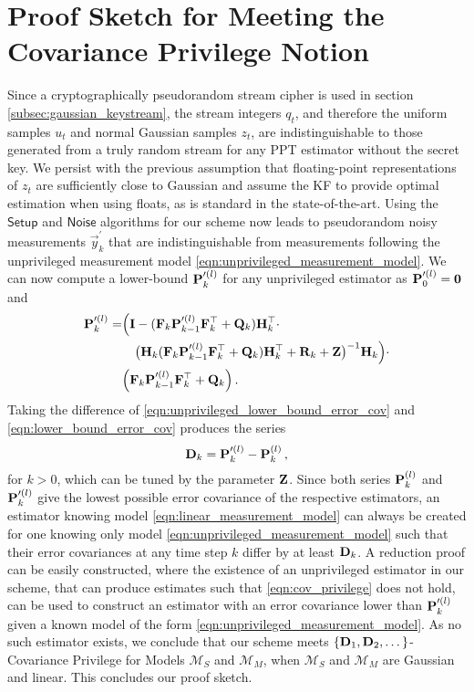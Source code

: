 \chapter{Proof Sketch for Meeting the Covariance Privilege Notion}\label{app:priv_est_proof_sketch}
Since a cryptographically pseudorandom stream cipher is used in section \ref{subsec:gaussian_keystream}, the stream integers $q_t$, and therefore the uniform samples $u_t$ and normal Gaussian samples $z_t$, are indistinguishable to those generated from a truly random stream for any PPT estimator without the secret key. We persist with the previous assumption that floating-point representations of $z_t$ are sufficiently close to Gaussian and assume the KF to provide optimal estimation when using floats, as is standard in the state-of-the-art. Using the $\mathsf{Setup}$ and $\mathsf{Noise}$ algorithms for our scheme now leads to pseudorandom noisy measurements $\vec{y}^\prime_k$ that are indistinguishable from measurements following the unprivileged measurement model \eqref{eqn:unprivileged_measurement_model}. We can now compute a lower-bound ${{\mathbf{P}}}_k^{\prime(l)}$ for any unprivileged estimator as ${{\mathbf{P}}}_0^{\prime(l)}={{\mathbf{0}}}$ and
\begin{equation}\label{eqn:unprivileged_lower_bound_error_cov}
   \begin{split}
      {\ensuremath{{\mathbf{P}}}}_k^{\prime(l)} =& \Bigl( {{\mathbf{I}}} - ({{\mathbf{F}}}_k{{\mathbf{P}}}_{k-1}^{\prime(l)}{{\mathbf{F}}}_k^\top + {{\mathbf{Q}}}_k){{\mathbf{H}}}_k^\top \cdot \\
      &\quad\bigl({{\mathbf{H}}}_k({{\mathbf{F}}}_k{{\mathbf{P}}}_{k-1}^{\prime(l)}{{\mathbf{F}}}_k^\top + {{\mathbf{Q}}}_k){{\mathbf{H}}}_k^\top + {{\mathbf{R}}}_k+{{\mathbf{Z}}}\bigr)^{-1}{{\mathbf{H}}}_k\Bigr)\cdot\\
      &\Bigl({{\mathbf{F}}}_k{{\mathbf{P}}}_{k-1}^{\prime(l)}{{\mathbf{F}}}_k^\top + {{\mathbf{Q}}}_k\Bigr)\,.
   \end{split}
\end{equation}
Taking the difference of \eqref{eqn:unprivileged_lower_bound_error_cov} and \eqref{eqn:lower_bound_error_cov} produces the series
\begin{equation}\label{eqn:covariance_difference_series}
   {\ensuremath{{\mathbf{D}}}}_k = {{\mathbf{P}}}_k^{\prime(l)} - {{\mathbf{P}}}_k^{(l)}\,,
\end{equation}
for $k>0$, which can be tuned by the parameter ${{\mathbf{Z}}}$. Since both series ${{\mathbf{P}}}_k^{(l)}$ and ${{\mathbf{P}}}_k^{\prime(l)}$ give the lowest possible error covariance of the respective estimators, an estimator knowing model \eqref{eqn:linear_measurement_model} can always be created for one knowing only model \eqref{eqn:unprivileged_measurement_model} such that their error covariances at any time step $k$ differ by at least ${{\mathbf{D}}}_k$. A reduction proof can be easily constructed, where the existence of an unprivileged estimator in our scheme, that can produce estimates such that \eqref{eqn:cov_privilege} does not hold, can be used to construct an estimator with an error covariance lower than ${{\mathbf{P}}}_k^{\prime(l)}$ given a known model of the form \eqref{eqn:unprivileged_measurement_model}. As no such estimator exists, we conclude that our scheme meets $\{{{\mathbf{D}}}_1,{{\mathbf{D}}}_2,\dots\}$-Covariance Privilege for Models $\mathcal{M}_S$ and $\mathcal{M}_M$, when $\mathcal{M}_S$ and $\mathcal{M}_M$ are Gaussian and linear. This concludes our proof sketch.
